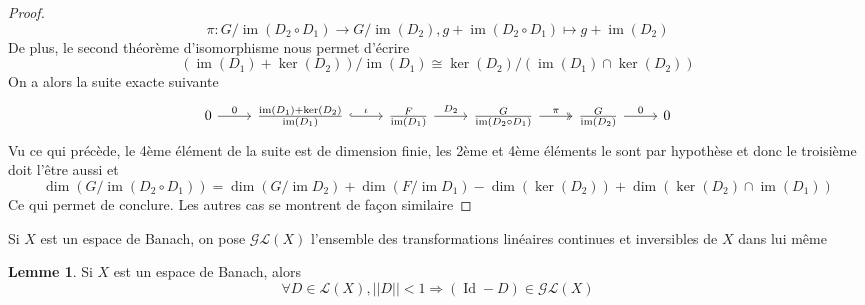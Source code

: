 \documentclass[a4paper,12pt,oneside,titlepage]{article}
\newcommand{\im}[0]{\operatorname{im}}
\theoremstyle{definition}
\newtheorem{lemme}[definition]{Lemme}
\theoremstyle{plain}
\begin{document}
\begin{proof}
\begin{equation*}
    \pi : G/\im(D_2\circ D_1)\rightarrow 
    G/\im(D_2), g+\im(D_2\circ D_1)\mapsto g+\im(D_2) 
\end{equation*}
De plus, le second théorème d'isomorphisme nous permet d'écrire
\begin{equation*}
    (\im(D_1)+\ker(D_2))/\im(D_1)\cong \ker(D_2)/(\im(D_1)\cap \ker(D_2) )
\end{equation*}
On a alors la suite exacte suivante
\[\begin{tikzcd}
	0 & {\frac{\operatorname{im} (D_1)+\ker(D_2)}{\operatorname{im} (D_1)}} & {\frac{F}{\operatorname{im} (D_1)}} & {\frac{G}{\operatorname{im} (D_2\circ D_1)}} & { \frac{G}{\operatorname{im}(D_2)}} & 0
	\arrow["0", from=1-1, to=1-2]
	\arrow["\iota", hook, from=1-2, to=1-3]
	\arrow["{D_2}", from=1-3, to=1-4]
	\arrow["\pi", two heads, from=1-4, to=1-5]
	\arrow["0", from=1-5, to=1-6]
\end{tikzcd}\]
Vu ce qui précède, le 4ème élément de la suite est de dimension finie, les 2ème et 4ème éléments le sont par hypothèse  et donc le troisième doit l'être aussi et
\begin{equation*}
    \dim(G/\im(D_2\circ D_1)) = \dim(G/\im D_2) + \dim(F/\im D_1) - \dim(\ker(D_2)) + \dim(\ker(D_2)\cap \im(D_1))
\end{equation*}
Ce qui permet de conclure. Les autres cas se montrent de façon similaire
\end{proof}
Si $X$ est un espace de Banach, on pose $\mathcal{GL}(X)$ l'ensemble des transformations linéaires continues et inversibles de $X$ dans lui même
\begin{lemme}
    Si $X$ est un espace de Banach, alors 
    \begin{equation*}
        \forall D\in\mathcal{L}(X), ||D||< 1 \Rightarrow (\operatorname*{Id}-D)\in\mathcal{GL}(X)
    \end{equation*}
\end{lemme}
\end{document}

